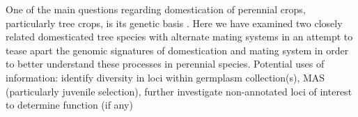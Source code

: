 \documentclass[12pt]{article}
\begin{document}
One of the main questions regarding domestication of perennial crops, particularly tree crops, is its genetic basis \citep{miller2011forest}. %
%
Here we have examined two closely related domesticated tree species with alternate mating systems in an attempt to tease apart the genomic signatures of domestication and mating system in order to better understand these processes in perennial species.
%
Potential uses of information: identify diversity in loci within germplasm collection(s), MAS (particularly juvenile selection), further investigate non-annotated loci of interest to determine function (if any)
%
%
%
%
%
\end{document}
